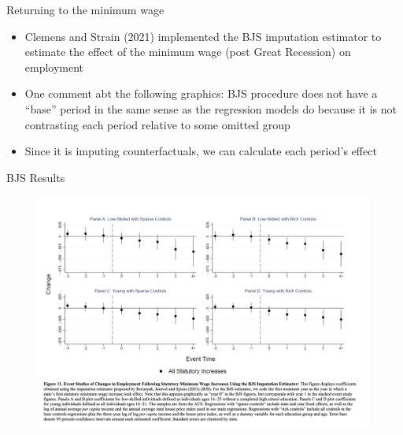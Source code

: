 \documentclass{beamer}
\begin{document}
\begin{frame}{Returning to the minimum wage}

\begin{itemize}
\item Clemens and Strain (2021) implemented the BJS imputation estimator to estimate the effect of the minimum wage (post Great Recession) on employment
\item One comment abt the following graphics: BJS procedure does not have a ``base'' period in the same sense as the regression models do because it is not contrasting each period relative to some omitted group
\item Since it is imputing counterfactuals, we can calculate each period's effect
\end{itemize}

\end{frame}

\begin{frame}{BJS Results}

	\begin{figure}
	\includegraphics[scale=0.25]{./lecture_includes/Clemens_bjs_1.png}
	\end{figure}

\end{frame}
\end{document}
